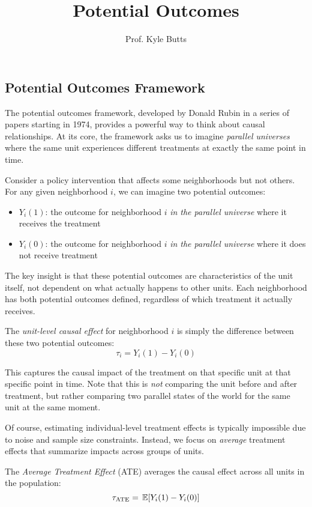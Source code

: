 \documentclass[12pt]{article}
\title{Potential Outcomes}
\author{Prof. Kyle Butts}
\date{}
\begin{document}
\maketitle
\begin{multicols}{2}
\section*{Potential Outcomes Framework}

The potential outcomes framework, developed by Donald Rubin in a series of papers starting in 1974, provides a powerful way to think about causal relationships.
At its core, the framework asks us to imagine \emph{parallel universes} where the same unit experiences different treatments at exactly the same point in time.

Consider a policy intervention that affects some neighborhoods but not others.
For any given neighborhood $i$, we can imagine two potential outcomes:
\begin{itemize}
  \item $Y_i(1)$: the outcome for neighborhood $i$ \emph{in the parallel universe} where it receives the treatment
  \item $Y_i(0)$: the outcome for neighborhood $i$ \emph{in the parallel universe} where it does not receive treatment
\end{itemize}

The key insight is that these potential outcomes are characteristics of the unit itself, not dependent on what actually happens to other units.
Each neighborhood has both potential outcomes defined, regardless of which treatment it actually receives.

The \emph{unit-level causal effect} for neighborhood $i$ is simply the difference between these two potential outcomes:
$$\tau_i = Y_i(1) - Y_i(0)$$

This captures the causal impact of the treatment on that specific unit at that specific point in time.
Note that this is \emph{not} comparing the unit before and after treatment, but rather comparing two parallel states of the world for the same unit at the same moment.


Of course, estimating individual-level treatment effects is typically impossible due to noise and sample size constraints.
Instead, we focus on \emph{average} treatment effects that summarize impacts across groups of units.

The \emph{Average Treatment Effect} (ATE) averages the causal effect across all units in the population:
$$\tau_{\text{ATE}} = \expec{Y_i(1) - Y_i(0)}$$


\end{multicols}
\end{document}
